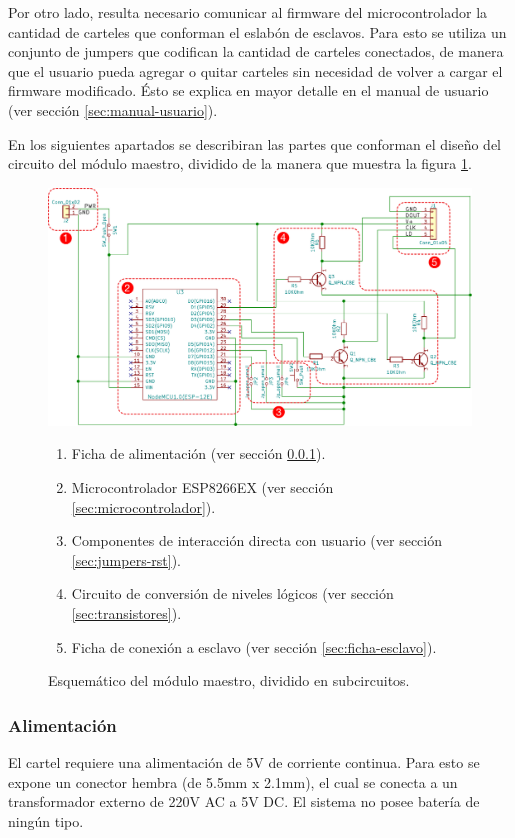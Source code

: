 Por otro lado, resulta necesario comunicar al firmware del microcontrolador la cantidad de carteles que conforman el eslabón de esclavos. Para esto se utiliza un conjunto de jumpers que codifican la cantidad de carteles conectados, de manera que el usuario pueda agregar o quitar carteles sin necesidad de volver a cargar el firmware modificado. Ésto se explica en mayor detalle en el manual de usuario (ver sección \ref{sec:manual-usuario}).

En los siguientes apartados se describiran las partes que conforman el diseño del circuito del módulo maestro, dividido de la manera que muestra la figura \ref{fig:esquematico-master-anotado}.

\begin{figure}[ht!]
	\centering
	\includegraphics[width=\linewidth]{imagenes/esquematico-master-anotado.pdf}
	\caption{Esquemático del módulo maestro, dividido en subcircuitos.}
	\label{fig:esquematico-master-anotado}
	\begin{enumerate}
		\item Ficha de alimentación (ver sección \ref{sec:alimentacion}).
		\item Microcontrolador ESP8266EX (ver sección \ref{sec:microcontrolador}).
		\item Componentes de interacción directa con usuario (ver sección \ref{sec:jumpers-rst}).
		\item Circuito de conversión de niveles lógicos (ver sección \ref{sec:transistores}).
		\item Ficha de conexión a esclavo (ver sección \ref{sec:ficha-esclavo}).
	\end{enumerate}
\end{figure}

\subsubsection{Alimentación} \label{sec:alimentacion}
El cartel requiere una alimentación de 5V de corriente continua. Para esto se expone un conector hembra (de 5.5mm x 2.1mm), el cual se conecta a un transformador externo de 220V AC a 5V DC. El sistema no posee batería de ningún tipo.

